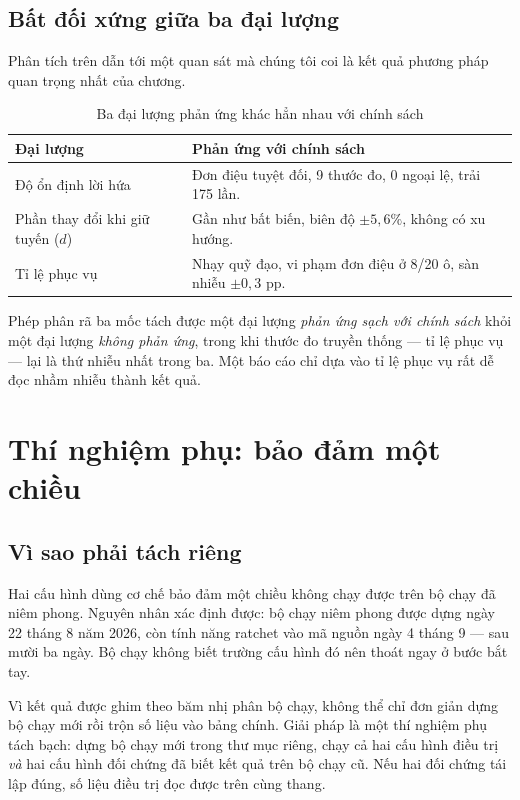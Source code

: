 \subsection{Bất đối xứng giữa ba đại lượng}

Phân tích trên dẫn tới một quan sát mà chúng tôi coi là kết quả phương pháp quan trọng nhất của
chương.

\begin{table}[htbp]
\centering
\caption{Ba đại lượng phản ứng khác hẳn nhau với chính sách}
\label{bang:batdoixung}
\small
\begin{tabular}{@{}lp{9.4cm}@{}}
\toprule
\textbf{Đại lượng} & \textbf{Phản ứng với chính sách}\\
\midrule
Độ ổn định lời hứa & Đơn điệu tuyệt đối, 9 thước đo, 0 ngoại lệ, trải 175 lần.\\
Phần thay đổi khi giữ tuyến ($d$) & Gần như bất biến, biên độ $\pm 5{,}6\%$, không có xu hướng.\\
Tỉ lệ phục vụ & Nhạy quỹ đạo, vi phạm đơn điệu ở 8/20 ô, sàn nhiễu $\pm 0{,}3$ pp.\\
\bottomrule
\end{tabular}
\end{table}

Phép phân rã ba mốc tách được một đại lượng \emph{phản ứng sạch với chính sách} khỏi một đại
lượng \emph{không phản ứng}, trong khi thước đo truyền thống --- tỉ lệ phục vụ --- lại là thứ
nhiễu nhất trong ba. Một báo cáo chỉ dựa vào tỉ lệ phục vụ rất dễ đọc nhầm nhiễu thành kết quả.

\section{Thí nghiệm phụ: bảo đảm một chiều}
\label{muc:ratchet}

\subsection{Vì sao phải tách riêng}

Hai cấu hình dùng cơ chế bảo đảm một chiều không chạy được trên bộ chạy đã niêm phong. Nguyên
nhân xác định được: bộ chạy niêm phong được dựng ngày 22 tháng 8 năm 2026, còn tính năng ratchet
vào mã nguồn ngày 4 tháng 9 --- sau mười ba ngày. Bộ chạy không biết trường cấu hình đó nên
thoát ngay ở bước bắt tay.

Vì kết quả được ghim theo băm nhị phân bộ chạy, không thể chỉ đơn giản dựng bộ chạy mới rồi trộn
số liệu vào bảng chính. Giải pháp là một thí nghiệm phụ tách bạch: dựng bộ chạy mới trong thư
mục riêng, chạy cả hai cấu hình điều trị \emph{và} hai cấu hình đối chứng đã biết kết quả trên
bộ chạy cũ. Nếu hai đối chứng tái lập đúng, số liệu điều trị đọc được trên cùng thang.

